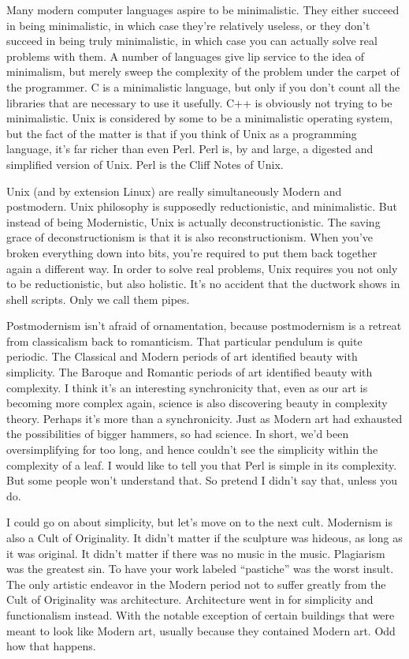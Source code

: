 Many modern computer languages aspire to be minimalistic. They either succeed
in being minimalistic, in which case they're relatively useless, or they
don't succeed in being truly minimalistic, in which case you can actually
solve real problems with them. A number of languages give lip service to the
idea of minimalism, but merely sweep the complexity of the problem under the
carpet of the programmer. C is a minimalistic language, but only if you don't
count all the libraries that are necessary to use it usefully. C++ is
obviously not trying to be minimalistic. Unix is considered by some to be a
minimalistic operating system, but the fact of the matter is that if you
think of Unix as a programming language, it's far richer than even Perl. Perl
is, by and large, a digested and simplified version of Unix. Perl is the
Cliff Notes of Unix.

Unix (and by extension Linux) are really simultaneously Modern and
postmodern. Unix philosophy is supposedly reductionistic, and minimalistic.
But instead of being Modernistic, Unix is actually deconstructionistic. The
saving grace of deconstructionism is that it is also reconstructionism. When
you've broken everything down into bits, you're required to put them back
together again a different way. In order to solve real problems, Unix
requires you not only to be reductionistic, but also holistic. It's no
accident that the ductwork shows in shell scripts. Only we call them pipes.

Postmodernism isn't afraid of ornamentation, because postmodernism is a
retreat from classicalism back to romanticism. That particular pendulum is
quite periodic. The Classical and Modern periods of art identified beauty
with simplicity. The Baroque and Romantic periods of art identified beauty
with complexity. I think it's an interesting synchronicity that, even as our
art is becoming more complex again, science is also discovering beauty in
complexity theory. Perhaps it's more than a synchronicity. Just as Modern art
had exhausted the possibilities of bigger hammers, so had science. In short,
we'd been oversimplifying for too long, and hence couldn't see the simplicity
within the complexity of a leaf. I would like to tell you that Perl is simple
in its complexity. But some people won't understand that. So pretend I didn't
say that, unless you do.

I could go on about simplicity, but let's move on to the next cult. Modernism
is also a Cult of Originality. It didn't matter if the sculpture was hideous,
as long as it was original. It didn't matter if there was no music in the
music. Plagiarism was the greatest sin. To have your work labeled
``pastiche'' was the worst insult. The only artistic endeavor in the Modern
period not to suffer greatly from the Cult of Originality was architecture.
Architecture went in for simplicity and functionalism instead. With the
notable exception of certain buildings that were meant to look like Modern
art, usually because they contained Modern art. Odd how that happens.

